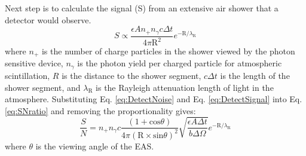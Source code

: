 Next step is to calculate the signal (S) from an extensive air shower that a detector would observe.
\begin{equation}
S \propto \frac{\epsilon A n_{+} n_{\gamma} c \Delta t}{4 \pi \mathrm{R}^2} e^{-\mathrm{R}/\lambda_{\mathrm{R}}} \label{eq:DetectSignal}
\end{equation}
where $n_+$ is the number of charge particles in the shower viewed by the photon sensitive device, $n_{\gamma}$ is the photon yield per charged particle for atmospheric scintillation, $R$ is the distance to the shower segment, $c\Delta t$ is the length of the shower segment, and $\lambda_{\mathrm{R}}$ is the Rayleigh attenuation length of light in the atmosphere. Substituting Eq. \ref{eq:DetectNoise} and Eq. \ref{eq:DetectSignal} into Eq. \ref{eq:SNratio} and removing the proportionality gives:
\begin{equation}
\frac{S}{N} = n_+ n_{\gamma} c \frac{(1 + \mathrm{cos}\theta)}{4 \pi (\mathrm{R} \times \mathrm{sin}\theta)^2} \sqrt{\frac{\epsilon A \Delta t}{b \Delta\Omega}} e^{-\mathrm{R}/\lambda_{\mathrm{R}}} \label{eq:SN_complete}
\end{equation}
where $\theta$ is the viewing angle of the EAS.

